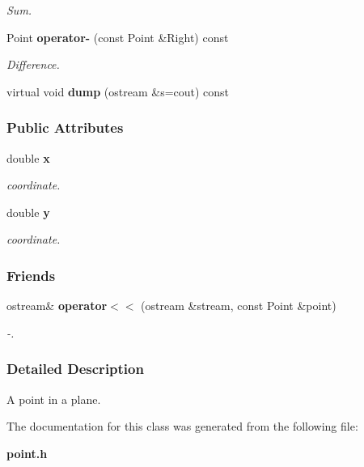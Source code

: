 \begin{CompactItemize}
\begin{CompactList}\small\item\em Sum.\item\end{CompactList}\item 
{}
Point {\bf operator-} (const Point \&Right) const\label{class_point_a5}

\begin{CompactList}\small\item\em Difference.\item\end{CompactList}\item 
{}
virtual void {\bf dump} (ostream \&s=cout) const\label{class_point_a6}

\end{CompactItemize}
\subsubsection*{Public Attributes}
\begin{CompactItemize}
\item 
{}
double {\bf x}\label{class_point_m0}

\begin{CompactList}\small\item\em coordinate.\item\end{CompactList}\item 
{}
double {\bf y}\label{class_point_m1}

\begin{CompactList}\small\item\em coordinate.\item\end{CompactList}\end{CompactItemize}
\subsubsection*{Friends}
\begin{CompactItemize}
\item 
{}
ostream\& {\bf operator$<$$<$} (ostream \&stream, const Point \&point)\label{class_point_l0}

\begin{CompactList}\small\item\em -.\item\end{CompactList}\end{CompactItemize}


\subsubsection{Detailed Description}
A point in a plane.



The documentation for this class was generated from the following file:\begin{CompactItemize}
\item 
{\bf point.h}\end{CompactItemize}
